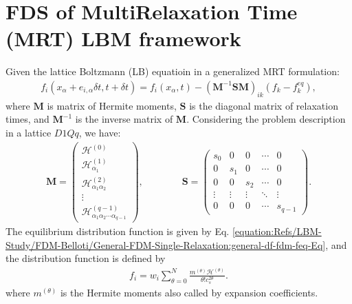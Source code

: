 \documentclass[letterpaper,10pt,english,openany,oneside]{jupyterBook}
\begin{document}
\section{FDS of Multi\sphinxhyphen{}Relaxation Time (MRT) LBM framework}
\label{\detokenize{Refs/LBM-Study/FDM-Belloti/General-FDM-Single-Relaxation:fds-of-multi-relaxation-time-mrt-lbm-framework}}
\sphinxAtStartPar
Given the lattice Boltzmann (LB) equatioin in a generalized MRT formulation:
\begin{equation}\label{equation:Refs/LBM-Study/FDM-Belloti/General-FDM-Single-Relaxation:MRT-LB-conv-df-Eq}
\begin{split}
f_i( x_{\alpha} + e_{i,\alpha} \delta t, t+\delta t) = f_i(x_{\alpha}, t)  - (\textbf{M}^{-1}\textbf{S}\textbf{M})_{ik}\left( f_{k} - f_{k}^{eq}  \right), 
\end{split}
\end{equation}
\sphinxAtStartPar
where \(\textbf{M}\) is matrix of Hermite moments, \(\textbf{S}\) is the diagonal matrix of relaxation times, and \(\textbf{M}^{-1}\) is the inverse matrix of \(\textbf{M}\). Considering the problem description in a lattice \(D1Qq\), we have:
\begin{equation*}
\begin{split}
\textbf{M} =\begin{pmatrix} \mathcal{H}^{(0)} \\ \mathcal{H}^{(1)}_{\alpha_{1}} \\ \mathcal{H}^{(2)}_{\alpha_{1}\alpha_{2}} \\ \vdots \\ \mathcal{H}^{(q-1)}_{\alpha_{1}\alpha_{2}\cdots\alpha_{q-1}}\end{pmatrix} ,  \qquad \qquad  \textbf{S} = \begin{pmatrix} s_0 & 0   & 0 & \cdots & 0 \\ 0 & s_1 & 0 & \cdots & 0 \\ 0   & 0   & s_2 & \cdots & 0 \\ \vdots & \vdots & \vdots & \ddots & \vdots \\ 0 & 0 & 0 & \cdots & s_{q-1} \end{pmatrix}.
\end{split}
\end{equation*}
\sphinxAtStartPar
The equilibrium distribution function is given by Eq. \eqref{equation:Refs/LBM-Study/FDM-Belloti/General-FDM-Single-Relaxation:general-df-fdm-feq-Eq}, and the distribution function is defined by
\begin{equation*}
\begin{split}
f_{i} = w_{i}\displaystyle\sum_{\theta=0}^{N}\frac{m^{(\theta)}\mathcal{H}^{(\theta)}}{\theta!c_{s}^{2\theta}}.
\end{split}
\end{equation*}
\sphinxAtStartPar
where \(m^{(\theta)}\) is the Hermite moments also called by expansion coefficients.
\end{document}
